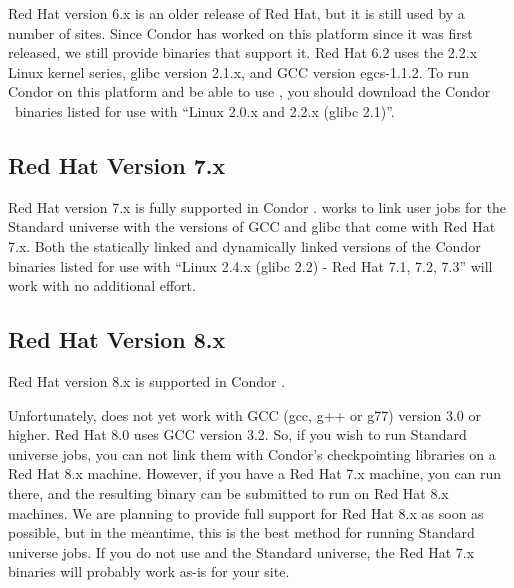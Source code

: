 Red Hat version 6.x is an older release of Red Hat, but it is still used
by a number of sites.
Since Condor has worked on this platform since it was first released,
we still provide binaries that support it.
Red Hat 6.2 uses the 2.2.x Linux kernel series, glibc version 2.1.x,
and GCC version egcs-1.1.2.
To run Condor on this platform and be able to use ,
you should download the Condor \VersionNotice\  binaries listed for use
with ``Linux 2.0.x and 2.2.x (glibc 2.1)''.


\subsection{\label{sec:platform-linux-rh7}Red Hat Version 7.x}

Red Hat version 7.x is fully supported in Condor \VersionNotice.
 works to link user jobs for the Standard universe
with the versions of GCC and glibc that come with Red Hat 7.x.
Both the statically linked and dynamically linked versions of the
Condor binaries listed for use with ``Linux 2.4.x (glibc 2.2) - Red Hat
7.1, 7.2, 7.3'' will work with no additional effort.


\subsection{\label{sec:platform-linux-rh8}Red Hat Version 8.x}

Red Hat version 8.x is supported in Condor \VersionNotice.
  
Unfortunately,  does not yet work with GCC (gcc, g++
or g77) version 3.0 or higher.
Red Hat 8.0 uses GCC version 3.2.
So, if you wish to run Standard universe jobs, you can not link them
with Condor's checkpointing libraries on a Red Hat 8.x machine.
However, if you have a Red Hat 7.x machine, you can run
 there, and the resulting binary can be submitted to
run on Red Hat 8.x machines.
We are planning to provide full support for Red Hat 8.x as soon as
possible, but in the meantime, this is the best method for running
Standard universe jobs.
If you do not use  and the Standard universe, the
Red Hat 7.x binaries will probably work as-is for your site. 


